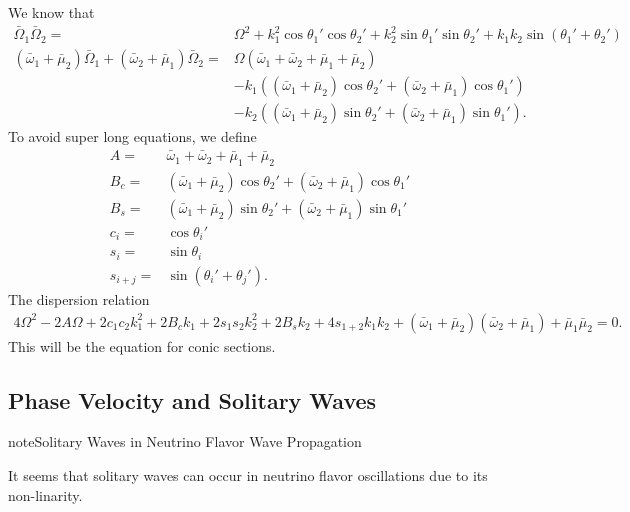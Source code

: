 \documentclass[letterpaper,12pt,english]{sphinxmanual}
\begin{document}
We know that
\begin{equation*}
\begin{split}\bar\Omega_1\bar\Omega_2=& \Omega^2 + k_1^2\cos\theta_1'\cos\theta_2' + k_2^2\sin\theta_1'\sin\theta_2' + k_1k_2\sin(\theta_1'+\theta_2')\\
(\bar\omega_1+\bar\mu_2)\bar\Omega_1 + (\bar\omega_2+\bar\mu_1)\bar\Omega_2
=& \Omega(\bar\omega_1+\bar\omega_2+\bar\mu_1+\bar\mu_2) \\
&- k_1( (\bar\omega_1+\bar\mu_2)\cos\theta_2' + (\bar\omega_2+\bar\mu_1)\cos\theta_1' ) \\
& -k_2((\bar\omega_1+\bar\mu_2)\sin\theta_2' + (\bar\omega_2+\bar\mu_1)\sin\theta_1').\end{split}
\end{equation*}
To avoid super long equations, we define
\begin{equation*}
\begin{split}A =& \bar\omega_1+\bar\omega_2+\bar\mu_1+\bar\mu_2\\
B_c =& (\bar\omega_1+\bar\mu_2)\cos\theta_2' + (\bar\omega_2+\bar\mu_1)\cos\theta_1' \\
B_s =& (\bar\omega_1+\bar\mu_2)\sin\theta_2' + (\bar\omega_2+\bar\mu_1)\sin\theta_1'\\
c_i=&\cos\theta_i' \\
s_i=& \sin\theta_i\\
s_{i+j}=&\sin(\theta_i'+\theta_j').\end{split}
\end{equation*}
The dispersion relation
\begin{equation*}
\begin{split}4\Omega^2-2A\Omega+2c_1c_2k_1^2 + 2 B_c k_1 + 2s_1s_2 k_2^2 +2 B_s k_2 + 4s_{1+2}k_1k_2 + (\bar\omega_1+\bar\mu_2)(\bar\omega_2+\bar\mu_1) + \bar\mu_1\bar\mu_2 = 0.\end{split}
\end{equation*}
This will be the equation for conic sections.


\subsection{Phase Velocity and Solitary Waves}
\label{\detokenize{collective/directional-instability:phase-velocity-and-solitary-waves}}
\begin{sphinxadmonition}{note}{Solitary Waves in Neutrino Flavor Wave Propagation}

It seems that solitary waves can occur in neutrino flavor oscillations due to its non-linarity.
\end{sphinxadmonition}
\end{document}
